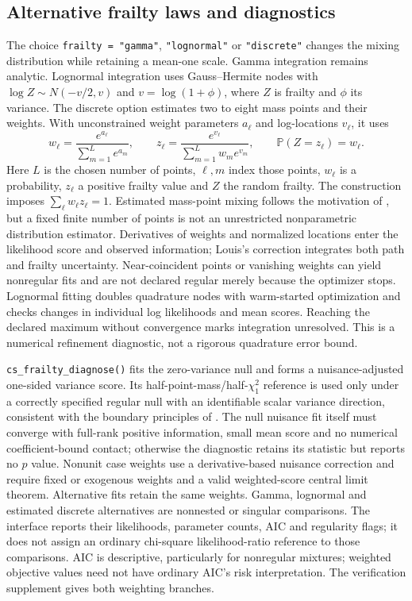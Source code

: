 \documentclass[article,nojss]{jss}
\newcommand{\code}[1]{\texttt{#1}}
\newcommand{\Prb}{\mathbb{P}}
\begin{document}
\subsection{Alternative frailty laws and diagnostics}
The choice \code{frailty = "gamma"}, \code{"lognormal"} or \code{"discrete"} changes the mixing distribution while retaining a mean-one scale. Gamma integration remains analytic. Lognormal integration uses Gauss--Hermite nodes with $\log Z\sim N(-v/2,v)$ and $v=\log(1+\phi)$, where $Z$ is frailty and $\phi$ its variance. The discrete option estimates two to eight mass points and their weights. With unconstrained weight parameters $a_\ell$ and log-locations $v_\ell$, it uses
\begin{equation}\label{eq:discrete}
 w_\ell=\frac{e^{a_\ell}}{\sum_{m=1}^L e^{a_m}},\qquad
 z_\ell=\frac{e^{v_\ell}}{\sum_{m=1}^L w_m e^{v_m}},\qquad
 \Prb(Z=z_\ell)=w_\ell.
\end{equation}
Here $L$ is the chosen number of points, $\ell,m$ index those points, $w_\ell$ is a probability, $z_\ell$ a positive frailty value and $Z$ the random frailty. The construction imposes $\sum_\ell w_\ell z_\ell=1$. Estimated mass-point mixing follows the motivation of \citet{Heckman1984}, but a fixed finite number of points is not an unrestricted nonparametric distribution estimator. Derivatives of weights and normalized locations enter the likelihood score and observed information; Louis's correction integrates both path and frailty uncertainty. Near-coincident points or vanishing weights can yield nonregular fits and are not declared regular merely because the optimizer stops. Lognormal fitting doubles quadrature nodes with warm-started optimization and checks changes in individual log likelihoods and mean scores. Reaching the declared maximum without convergence marks integration unresolved. This is a numerical refinement diagnostic, not a rigorous quadrature error bound.

\code{cs\_frailty\_diagnose()} fits the zero-variance null and forms a nuisance-adjusted one-sided variance score. Its half-point-mass/half-$\chi^2_1$ reference is used only under a correctly specified regular null with an identifiable scalar variance direction, consistent with the boundary principles of \citet{Self1987}. The null nuisance fit itself must converge with full-rank positive information, small mean score and no numerical coefficient-bound contact; otherwise the diagnostic retains its statistic but reports no $p$ value. Nonunit case weights use a derivative-based nuisance correction and require fixed or exogenous weights and a valid weighted-score central limit theorem. Alternative fits retain the same weights. Gamma, lognormal and estimated discrete alternatives are nonnested or singular comparisons. The interface reports their likelihoods, parameter counts, AIC and regularity flags; it does not assign an ordinary chi-square likelihood-ratio reference to those comparisons. AIC is descriptive, particularly for nonregular mixtures; weighted objective values need not have ordinary AIC's risk interpretation. The verification supplement gives both weighting branches.
\end{document}
